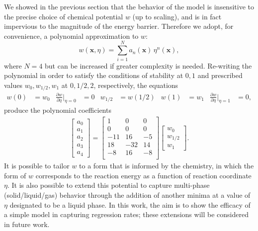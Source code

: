 \documentclass[colorinlistoftodos,review]{elsarticle}
\begin{document}
We showed in the previous section that the behavior of the model is insensitive to the precise choice of chemical potential $w$ (up to scaling), and is in fact impervious to the magnitude of the energy barrier.
Therefore we adopt, for convenience, a polynomial approximation to $w$:
\begin{equation} \label{eq:11}
  w(\mathbf{x},\eta) = \sum_{i=1}^N a_{n}(\mathbf{x})\,\eta^n(\bm{x}),
\end{equation}  
where $N=4$ but can be increased if greater complexity is needed.
Re-writing the polynomial in order to satisfy the conditions of stability at $0,1$ and prescribed values $w_0,w_{1/2},w_{1}$ at $0,1/2,2$, respectively, the equations
\begin{align} \label{eq:12}
  w(0) &= w_0
  &
    \frac{\partial w}{\partial\eta}\Big|_{\eta=0} &= 0
  &  w_{1/2} &= w(1/2) 
  &
    w(1)   &=   w_1
  &
    \frac{\partial w}{\partial\eta}\Big|_{\eta=1} &= 0,
\end{align}
produce the polynomial coefficients
\renewcommand{\arraystretch}{0.6}
\begin{align} \label{eq:13}
  \begin{bmatrix}
    a_0 \\ a_1 \\ a_2 \\ a_3 \\ a_4 
  \end{bmatrix}
  = 
  \begin{bmatrix}
    1 & 0 & 0 \\
    0 & 0 & 0 \\
    -11 & 16 & -5 \\
    18 & -32 & 14 \\
    -8 & 16 & -8 \\
  \end{bmatrix}
  \begin{bmatrix}
    w_0 \\ w_{1/2} \\ w_{1} 
  \end{bmatrix}.
\end{align}
It is possible to tailor $w$ to a form that is informed by the chemistry, in which the form of $w$ corresponds to the reaction energy as a function of reaction coordinate $\eta$.
It is also possible to extend this potential to capture multi-phase (solid\slash liquid\slash gas) behavior through the addition of another minima at a value of $\eta$ designated to be a liquid phase.
In this work, the aim is to show the efficacy of a simple model in capturing regression rates; these extensions will be considered in future work.
\end{document}
